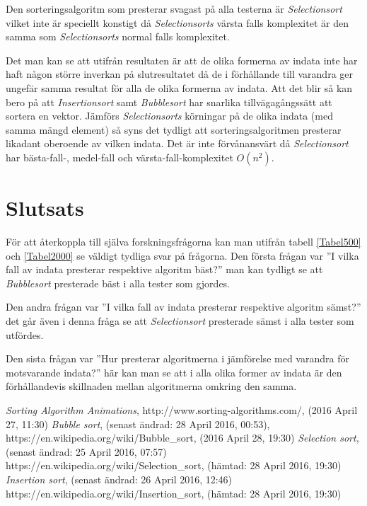 \documentclass[a4paper]{article}
\begin{document}
Den sorteringsalgoritm som presterar svagast på alla testerna är \emph{Selectionsort} vilket inte är speciellt konstigt då \emph{Selectionsorts} värsta falls komplexitet är den samma som \emph{Selectionsorts} normal falls komplexitet. 

Det man kan se att utifrån resultaten är att de olika formerna av indata inte har haft någon större inverkan på slutresultatet då de i förhållande till varandra ger ungefär samma resultat för alla de olika formerna av indata. Att det blir så kan bero på att \emph{Insertionsort} samt \emph{Bubblesort} har snarlika tillvägagångssätt att sortera en vektor. Jämförs \emph{Selectionsorts} körningar på de olika indata (med samma mängd element) så syns det tydligt att sorteringsalgoritmen presterar likadant oberoende av vilken indata. Det är inte förvånansvärt då \emph{Selectionsort} har bästa-fall-, medel-fall och värsta-fall-komplexitet $O(n^2)$.   

\section{Slutsats}
För att återkoppla till själva forskningsfrågorna kan man utifrån tabell \ref{Tabel500} och \ref{Tabel2000} se väldigt tydliga svar på frågorna. Den första frågan var ''I vilka fall av indata presterar respektive algoritm bäst?'' man kan tydligt se att \emph{Bubblesort} presterade bäst i alla tester som gjordes.

Den andra frågan var ''I vilka fall av indata presterar respektive algoritm sämst?'' det går även i denna fråga se att \emph{Selectionsort} presterade sämst i alla tester som utfördes.

Den sista frågan var ''Hur presterar algoritmerna i jämförelse med varandra för motsvarande indata?'' här kan man se att i alla olika former av indata är den förhållandevis skillnaden mellan algoritmerna omkring den samma.

\begin{thebibliography}{99}
	 \emph{Sorting Algorithm Animations}, http://www.sorting-algorithms.com/, (2016 April 27, 11:30)
	 \emph{Bubble sort}, (senast ändrad: 28 April 2016, 00:53), https://en.wikipedia.org/wiki/Bubble\_sort, (2016 April 28, 19:30)
	 \emph{Selection sort}, (senast ändrad: 25 April 2016, 07:57) https://en.wikipedia.org/wiki/Selection\_sort, (hämtad: 28 April 2016, 19:30)
	 \emph{Insertion sort}, (senast ändrad: 26 April 2016, 12:46) https://en.wikipedia.org/wiki/Insertion\_sort, (hämtad: 28 April 2016, 19:30)
\end{thebibliography}
\end{document}

